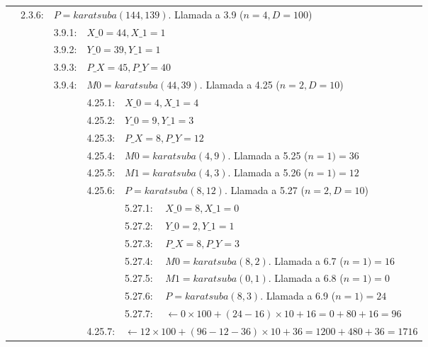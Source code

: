 \documentclass[titlepage,a4paper]{article}
\begin{document}
\begin{longtable}[r]{lllllll}
\multicolumn{2}{l}{}     & 2.3.6:     & \multicolumn{4}{l}{$P=karatsuba(144,139)$. Llamada a 3.9 ($n=4,D=100$)}     \\
\multicolumn{3}{l}{}     & 3.9.1:     & \multicolumn{3}{l}{$X\_0=44, X\_1=1$}     \\
\multicolumn{3}{l}{}     & 3.9.2:     & \multicolumn{3}{l}{$Y\_0=39, Y\_1=1$}     \\
\multicolumn{3}{l}{}     & 3.9.3:     & \multicolumn{3}{l}{$P\_X=45, P\_Y=40$}     \\
\multicolumn{3}{l}{}     & 3.9.4:     & \multicolumn{3}{l}{$M0=karatsuba(44,39)$. Llamada a 4.25 ($n=2,D=10$)}     \\
\multicolumn{4}{l}{}     & 4.25.1:     & \multicolumn{2}{l}{$X\_0=4, X\_1=4$}     \\
\multicolumn{4}{l}{}     & 4.25.2:     & \multicolumn{2}{l}{$Y\_0=9, Y\_1=3$}     \\
\multicolumn{4}{l}{}     & 4.25.3:     & \multicolumn{2}{l}{$P\_X=8, P\_Y=12$}     \\
\multicolumn{4}{l}{}     & 4.25.4:     & \multicolumn{2}{l}{$M0=karatsuba(4,9)$. Llamada a 5.25 ($n=1) = \boxed{36}$}     \\
\multicolumn{4}{l}{}     & 4.25.5:     & \multicolumn{2}{l}{$M1=karatsuba(4,3)$. Llamada a 5.26 ($n=1) = \boxed{12}$}     \\
\multicolumn{4}{l}{}     & 4.25.6:     & \multicolumn{2}{l}{$P=karatsuba(8,12)$. Llamada a 5.27 ($n=2,D=10$)}     \\
\multicolumn{5}{l}{}     & 5.27.1:     & \multicolumn{1}{l}{$X\_0=8, X\_1=0$}     \\
\multicolumn{5}{l}{}     & 5.27.2:     & \multicolumn{1}{l}{$Y\_0=2, Y\_1=1$}     \\
\multicolumn{5}{l}{}     & 5.27.3:     & \multicolumn{1}{l}{$P\_X=8, P\_Y=3$}     \\
\multicolumn{5}{l}{}     & 5.27.4:     & \multicolumn{1}{l}{$M0=karatsuba(8,2)$. Llamada a 6.7 ($n=1) = \boxed{16}$}     \\
\multicolumn{5}{l}{}     & 5.27.5:     & \multicolumn{1}{l}{$M1=karatsuba(0,1)$. Llamada a 6.8 ($n=1) = \boxed{0}$}     \\
\multicolumn{5}{l}{}     & 5.27.6:     & \multicolumn{1}{l}{$P=karatsuba(8,3)$. Llamada a 6.9 ($n=1) = \boxed{24}$}     \\
\multicolumn{5}{l}{}     & 5.27.7:     & \multicolumn{1}{l}{$\leftarrow 0\times 100 + (24-16)\times 10 + 16 =  0 + 80 + 16 = \boxed{96}$}     \\
\multicolumn{4}{l}{}     & 4.25.7:     & \multicolumn{2}{l}{$\leftarrow 12\times 100 + (96-12-36)\times 10 + 36 =  1200 + 480 + 36 = \boxed{1716}$}     \\


\end{longtable}
\end{document}
